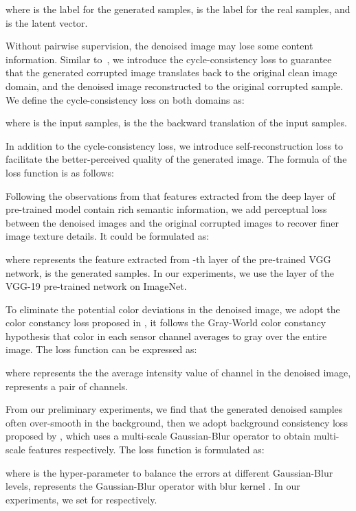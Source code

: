 \documentclass[journal]{IEEEtran}
\begin{document}
\noindent where  is the label for the generated samples,  is the label for the real samples, and  is the latent vector.

Without pairwise supervision, the denoised image may lose some content information. Similar to~\cite{zhu2017unpaired}, we introduce the cycle-consistency loss to guarantee that the generated corrupted image  translates back to the original clean image domain, and the denoised image  reconstructed to the original corrupted sample. We define the cycle-consistency loss on both domains as:

\noindent where  is the input samples,  is the the backward translation of the input samples.

In addition to the cycle-consistency loss, we introduce self-reconstruction loss to facilitate the better-perceived quality of the generated image. The formula of the loss function is as follows:


Following the observations from \cite{taigman2016unsupervised} that features extracted from the deep layer of pre-trained model contain rich semantic information, we add perceptual loss between the denoised images and the original corrupted images to recover finer image texture details. It could be formulated as:

\noindent where  represents the feature extracted from -th layer of the pre-trained VGG network,  is the generated samples. In our experiments, we use the  layer of the VGG-19 pre-trained network on ImageNet.

To eliminate the potential color deviations in the denoised image, we adopt the color constancy loss proposed in \cite{guo2020zero}, it follows the Gray-World color constancy hypothesis that color in each sensor channel averages to gray over the entire image. The loss function can be expressed as:

\noindent where  represents the the average intensity value of  channel in the denoised image,  represents a pair of channels.

From our preliminary experiments, we find that the generated denoised samples often over-smooth in the background, then we adopt background consistency loss proposed by \cite{du2020learning}, which uses a multi-scale Gaussian-Blur operator to obtain multi-scale features respectively. The loss function is formulated as:

\noindent where  is the hyper-parameter to balance the errors at different Gaussian-Blur levels,  represents the Gaussian-Blur operator with blur kernel . In our experiments, we set  for  respectively.
\end{document}
